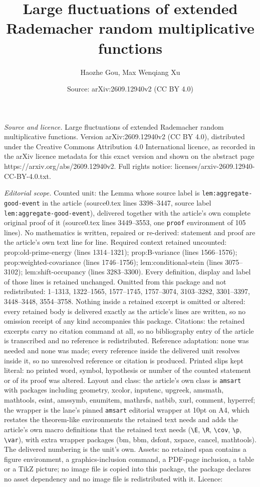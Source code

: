 \documentclass[10pt,a4paper]{amsart}
\title[Large fluctuations of extended Rademacher random multiplicat]{Large fluctuations of extended Rademacher random multiplicative functions}
\author{Haozhe Gou, Max Wenqiang Xu}
\date{Source: arXiv:2609.12940v2 (CC BY 4.0)}
\begin{document}
\maketitle

\noindent\emph{Source and licence.} Large fluctuations of extended Rademacher random multiplicative functions. Version arXiv:2609.12940v2 (CC BY 4.0), distributed under the Creative Commons Attribution 4.0 International licence, as recorded in the arXiv licence metadata for this exact version and shown on the abstract page https://arxiv.org/abs/2609.12940v2. Full rights notice: licenses/arxiv-2609.12940-CC-BY-4.0.txt.\par\smallskip

\noindent\textit{Editorial scope.} Counted unit: the Lemma whose source label is \texttt{lem:aggregate-good-event} in the article (source0.tex lines 3398--3447, source label \texttt{lem:aggregate-good-event}), delivered together with the article's own complete original proof of it (source0.tex lines 3449--3553, one \texttt{proof} environment of 105 lines). No mathematics is written, repaired or re-derived: statement and proof are the article's own text line for line. Required context retained uncounted: prop:old-prime-energy (lines 1314--1321); prop:B-variance (lines 1566--1576); prop:weighted-covariance (lines 1746--1756); lem:conditional-stein (lines 3075--3102); lem:shift-occupancy (lines 3283--3300). Every definition, display and label of those lines is retained unchanged. Omitted from this package and not redistributed: 1--1313, 1322--1565, 1577--1745, 1757--3074, 3103--3282, 3301--3397, 3448--3448, 3554--3758. Nothing inside a retained excerpt is omitted or altered: every retained body is delivered exactly as the article's lines are written, so no omission receipt of any kind accompanies this package. Citations: the retained excerpts carry no citation command at all, so no bibliography entry of the article is transcribed and no reference is redistributed. Reference adaptation: none was needed and none was made; every reference inside the delivered unit resolves inside it, so no unresolved reference or citation is produced. Printed slips kept literal: no printed word, symbol, hypothesis or number of the counted statement or of its proof was altered. Layout and class: the article's own class is \texttt{amsart} with packages including geometry, xcolor, inputenc, upgreek, amsmath, mathtools, esint, amssymb, enumitem, mathrsfs, natbib, xurl, comment, hyperref; the wrapper is the lane's pinned \texttt{amsart} editorial wrapper at 10pt on A4, which restates the theorem-like environments the retained text needs and adds the article's own macro definitions that the retained text needs (\texttt{\textbackslash E}, \texttt{\textbackslash R}, \texttt{\textbackslash cov}, \texttt{\textbackslash p}, \texttt{\textbackslash var}), with extra wrapper packages (bm, bbm, dsfont, xspace, cancel, mathtools). The delivered numbering is the unit's own. Assets: no retained span contains a figure environment, a graphics-inclusion command, a PDF-page inclusion, a table or a TikZ picture; no image file is copied into this package, the package declares no asset dependency and no image file is redistributed with it. Licence: 
\end{document}
